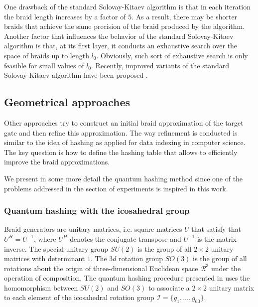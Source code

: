  One drawback of the standard Solovay-Kitaev algorithm is that in each iteration the braid length increases by a factor of $5$. As a result, there may be shorter braids that achieve the same precision of the braid produced by the algorithm. Another factor that influences the behavior of the standard Solovay-Kitaev algorithm is that, at its first layer, it conducts an exhaustive search over the space of braids up to length $l_0$. Obviously, such sort of exhaustive search is only feasible for small values of $l_0$. Recently, improved variants of the standard Solovay-Kitaev algorithm have been proposed \cite{Trung_et_al:2012}.


\subsection{Geometrical approaches} 

 Other approaches \cite{Burrello_et_al:2010,Burrello_et_al:2011,Mosseri:2008} try to construct an initial braid approximation of the target gate and then refine this approximation. The way refinement is conducted is similar to the idea of hashing as applied for data indexing in computer science. The key question is how to define the hashing table that allows to efficiently improve the braid approximations. 

 We present in some more detail the quantum hashing method since one of the problems addressed in the section of experiments is inspired in this work.
 
 \subsubsection{Quantum hashing with the icosahedral group} \label{sec:ICOSA}

Braid generators are unitary matrices, i.e. square matrices $U$ that satisfy that $U^H=U^{-1}$, where $U^H$ denotes the conjugate transpose and $U^{-1}$ is the matrix inverse. The special unitary group $SU(2)$ is the group of all $2 \times 2$ unitary matrices with determinant $1$. The $3d$ rotation group $SO(3)$ is the group of all rotations about the origin of three-dimensional Euclidean space $\mathcal{R}^3$ under the operation of composition. The quantum hashing procedure presented in  \cite{Burrello_et_al:2010,Burrello_et_al:2011} uses the homomorphism between $SU(2)$ and $SO(3)$ to associate a $2 \times 2$ unitary matrix to each element of the icosahedral rotation group
$\mathcal{I}=\{g_1,\dots,g_{60}\}.$

